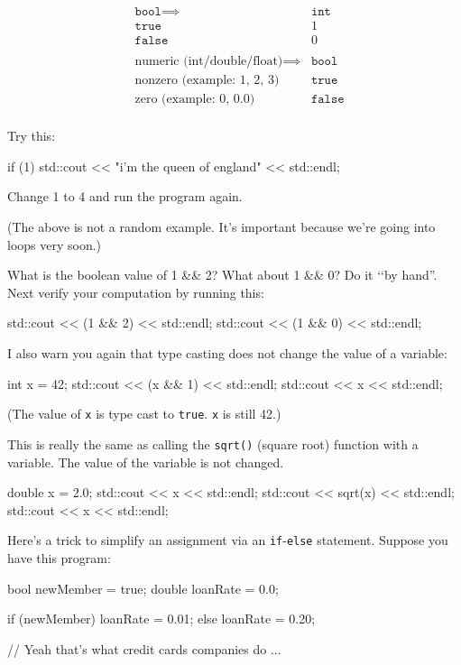 \begin{align*}
&\texttt{bool} \implies &\texttt{int}\\
&\texttt{true} &1\\
&\texttt{false} &0\\\\
&\text{numeric (int/double/float)} \implies &\texttt{bool}\\
&\text{nonzero (example: 1, 2, 3)} &\texttt{true}\\
&\text{zero (example: 0, 0.0)} &\texttt{false}\\
\end{align*}

Try this:\\
\begin{console}
if (1)
std::cout << "i'm the queen of england"
          << std::endl; 
\end{console}

Change 1 to 4 and run the program again.

(The above is not a random example. It's important
because we're going into loops very soon.)

\begin{ex}
What is the boolean value of 1 \&\& 2? What about 1 \&\& 0? Do it \lq\lq by hand''. Next verify your computation by running this:\\
\begin{console}
std::cout << (1 \&\& 2) << std::endl;
std::cout << (1 \&\& 0) << std::endl; 
\end{console}
\end{ex}

I also warn you again that type casting does not change the value of a
variable:\\
\begin{console}
int x = 42;
std::cout << (x \&\& 1) << std::endl;
std::cout << x << std::endl; 
\end{console}

(The value of \texttt{x} is type cast to \texttt{true}. \texttt{x} is still 42.)

This is really the same as calling the \texttt{sqrt()} (square root) function with a variable. The value of the variable is not changed.
\begin{console}
double x = 2.0;
std::cout << x << std::endl;
std::cout << sqrt(x) << std::endl;
std::cout << x << std::endl; 
\end{console}
\newpage{}

Here's a trick to simplify an assignment via an
\texttt{if}-\texttt{else} statement. Suppose you have this program:\\
\begin{console}
bool newMember = true;
double loanRate = 0.0;

if (newMember)
   loanRate = 0.01;
else
   loanRate = 0.20;

// Yeah that's what credit cards companies do ... 
\end{console}

